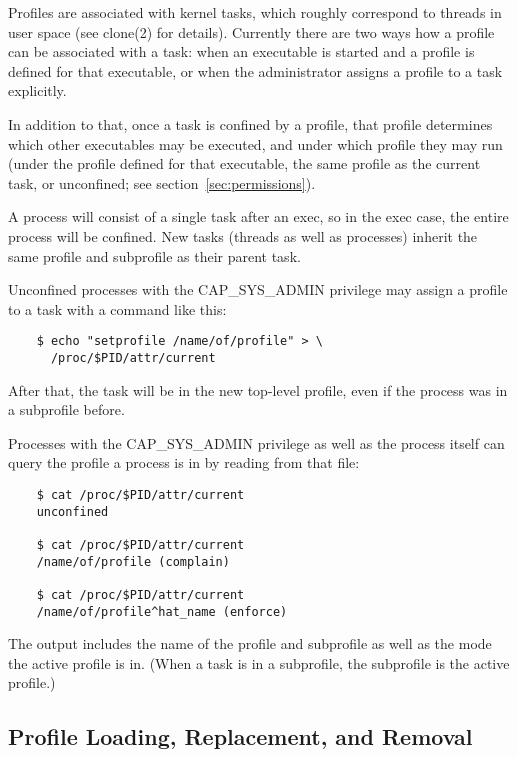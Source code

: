 \documentclass[a4paper]{article}
\renewcommand{\H}{\hspace{0pt}}
\begin{document}
Profiles are associated with kernel tasks, which roughly correspond to
threads in user space (see clone(2) for details).  Currently there are
two ways how a profile can be associated with a task: when an executable
is started and a profile is defined for that executable, or when the
administrator assigns a profile to a task explicitly.

In addition to that, once a task is confined by a profile, that profile
determines which other executables may be executed, and under which
profile they may run (under the profile defined for that executable, the
same profile as the current task, or unconfined; see
section~\ref{sec:permissions}).

A process will consist of a single task after an exec, so in the exec
case, the entire process will be confined.  New tasks (threads as well
as processes) inherit the same profile and subprofile as their parent
task.

Unconfined processes with the CAP\_{\H}SYS\_{\H}ADMIN privilege may assign a
profile to a task with a command like this:

\begin{small}
\begin{verbatim}
    $ echo "setprofile /name/of/profile" > \
      /proc/$PID/attr/current
\end{verbatim}
\end{small}

After that, the task will be in the new top-level profile, even if the
process was in a subprofile before.

Processes with the CAP\_{\H}SYS\_{\H}ADMIN privilege as well as the process itself
can query the profile a process is in by reading from that file:

\begin{small}
\begin{verbatim}
    $ cat /proc/$PID/attr/current
    unconfined

    $ cat /proc/$PID/attr/current
    /name/of/profile (complain)

    $ cat /proc/$PID/attr/current
    /name/of/profile^hat_name (enforce)
\end{verbatim}
\end{small}

The output includes the name of the profile and subprofile as well as
the mode the active profile is in.  (When a task is in a subprofile,
the subprofile is the active profile.)

\subsection{Profile Loading, Replacement, and Removal}
\end{document}
